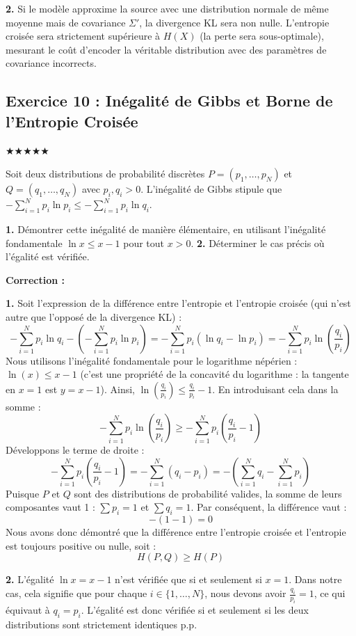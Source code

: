 \documentclass[11pt,a4paper]{article}
\begin{document}
\textbf{2.} Si le modèle approxime la source avec une distribution normale de même moyenne mais de covariance $\Sigma'$, la divergence KL sera non nulle. L'entropie croisée sera strictement supérieure à $H(X)$ (la perte sera sous-optimale), mesurant le coût d'encoder la véritable distribution avec des paramètres de covariance incorrects.


\subsection*{Exercice 10 : Inégalité de Gibbs et Borne de l'Entropie Croisée }

$\bigstar\bigstar\bigstar\bigstar\bigstar$


Soit deux distributions de probabilité discrètes $P = (p_1, \dots, p_N)$ et $Q = (q_1, \dots, q_N)$ avec $p_i, q_i > 0$.
L'inégalité de Gibbs stipule que $-\sum_{i=1}^N p_i \ln p_i \le -\sum_{i=1}^N p_i \ln q_i$.

\textbf{1.} Démontrer cette inégalité de manière élémentaire, en utilisant l'inégalité fondamentale $\ln x \le x - 1$ pour tout $x > 0$.
\textbf{2.} Déterminer le cas précis où l'égalité est vérifiée.

\textbf{Correction :}

\textbf{1.} Soit l'expression de la différence entre l'entropie et l'entropie croisée (qui n'est autre que l'opposé de la divergence KL) :
$$-\sum_{i=1}^N p_i \ln q_i - \left( - \sum_{i=1}^N p_i \ln p_i \right) = - \sum_{i=1}^N p_i (\ln q_i - \ln p_i) = - \sum_{i=1}^N p_i \ln\left(\frac{q_i}{p_i}\right)$$
Nous utilisons l'inégalité fondamentale pour le logarithme népérien : $\ln(x) \le x - 1$ (c'est une propriété de la concavité du logarithme : la tangente en $x=1$ est $y=x-1$).
Ainsi, $\ln\left(\frac{q_i}{p_i}\right) \le \frac{q_i}{p_i} - 1$.
En introduisant cela dans la somme :
$$- \sum_{i=1}^N p_i \ln\left(\frac{q_i}{p_i}\right) \ge - \sum_{i=1}^N p_i \left( \frac{q_i}{p_i} - 1 \right)$$
Développons le terme de droite :
$$- \sum_{i=1}^N p_i \left( \frac{q_i}{p_i} - 1 \right) = - \sum_{i=1}^N (q_i - p_i) = - \left( \sum_{i=1}^N q_i - \sum_{i=1}^N p_i \right)$$
Puisque $P$ et $Q$ sont des distributions de probabilité valides, la somme de leurs composantes vaut 1 : $\sum p_i = 1$ et $\sum q_i = 1$.
Par conséquent, la différence vaut :
$$- (1 - 1) = 0$$
Nous avons donc démontré que la différence entre l'entropie croisée et l'entropie est toujours positive ou nulle, soit :
$$H(P, Q) \ge H(P)$$

\textbf{2.} L'égalité $\ln x = x - 1$ n'est vérifiée que si et seulement si $x = 1$.
Dans notre cas, cela signifie que pour chaque $i \in \{1, \dots, N\}$, nous devons avoir $\frac{q_i}{p_i} = 1$, ce qui équivaut à $q_i = p_i$.
L'égalité est donc vérifiée si et seulement si les deux distributions sont strictement identiques p.p.
\end{document}
